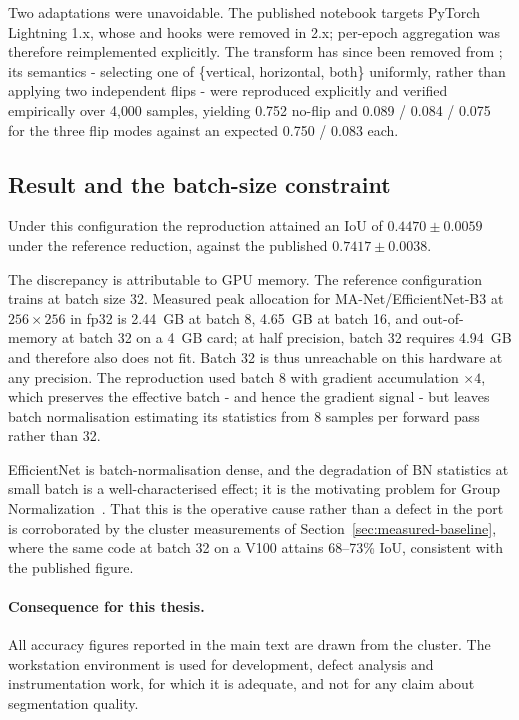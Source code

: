 Two adaptations were unavoidable.
The published notebook targets PyTorch Lightning 1.x, whose
 and  hooks were removed in
2.x; per-epoch aggregation was therefore reimplemented explicitly.
The  transform has since been removed from ;
its semantics - selecting one of \{vertical, horizontal, both\} uniformly, rather
than applying two independent flips - were reproduced explicitly and verified
empirically over 4{,}000 samples, yielding 0.752 no-flip and 0.089 / 0.084 / 0.075
for the three flip modes against an expected 0.750 / 0.083 each.

\subsection{Result and the batch-size constraint}
\label{sec:repro-result}

Under this configuration the reproduction attained an IoU of
$\mathbf{0.4470 \pm 0.0059}$ under the reference reduction, against the published
$0.7417 \pm 0.0038$.

The discrepancy is attributable to GPU memory.
The reference configuration trains at batch size 32.
Measured peak allocation for MA-Net/EfficientNet-B3 at $256 \times 256$ in fp32 is
2.44~GB at batch 8, 4.65~GB at batch 16, and out-of-memory at batch 32 on a 4~GB
card; at half precision, batch 32 requires 4.94~GB and therefore also does not fit.
Batch 32 is thus unreachable on this hardware at any precision.
The reproduction used batch 8 with gradient accumulation $\times 4$, which preserves
the effective batch - and hence the gradient signal - but leaves batch
normalisation estimating its statistics from 8 samples per forward pass rather
than 32.

EfficientNet is batch-normalisation dense, and the degradation of BN statistics at
small batch is a well-characterised effect; it is the motivating problem for
Group Normalization~\cite{Wu18,Ioffe15}.
That this is the operative cause rather than a defect in the port is corroborated by
the cluster measurements of Section~\ref{sec:measured-baseline}, where the same code
at batch 32 on a V100 attains 68--73\% IoU, consistent with the published figure.

\paragraph{Consequence for this thesis.}
All accuracy figures reported in the main text are drawn from the cluster.
The workstation environment is used for development, defect analysis and
instrumentation work, for which it is adequate, and not for any claim about
segmentation quality.

